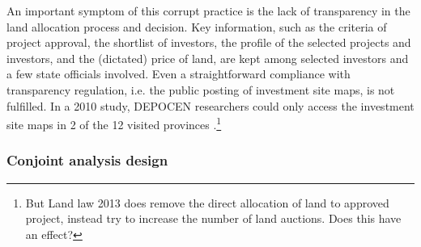 An important symptom of this corrupt practice is the lack of transparency in the land allocation process and decision. Key information, such as the criteria of project approval, the shortlist of investors, the profile of the selected projects and investors, and the (dictated) price of land, are kept among selected investors and a few state officials involved. Even a straightforward compliance with transparency regulation, i.e. the public posting of investment site maps, is not fulfilled. In a 2010 study, DEPOCEN researchers could only access the investment site maps in 2 of the 12 visited provinces \citep{Anderson2011}.\footnote{But Land law 2013 does remove the direct allocation of land to approved project, instead try to increase the number of land auctions. Does this have an effect?}

\subsubsection{Conjoint analysis design}
